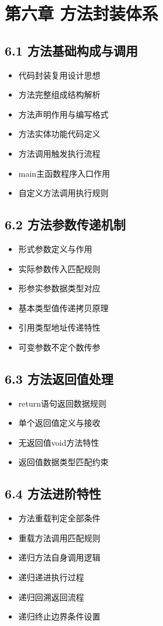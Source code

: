 \section{第六章 方法封装体系}
\subsection{6.1 方法基础构成与调用}
\begin{itemize}
\item 代码封装复用设计思想
\item 方法完整组成结构解析
\item 方法声明作用与编写格式
\item 方法实体功能代码定义
\item 方法调用触发执行流程
\item main主函数程序入口作用
\item 自定义方法调用执行规则
\end{itemize}

\subsection{6.2 方法参数传递机制}
\begin{itemize}
\item 形式参数定义与作用
\item 实际参数传入匹配规则
\item 形参实参数据类型对应
\item 基本类型值传递拷贝原理
\item 引用类型地址传递特性
\item 可变参数不定个数传参
\end{itemize}

\subsection{6.3 方法返回值处理}
\begin{itemize}
\item return语句返回数据规则
\item 单个返回值定义与接收
\item 无返回值void方法特性
\item 返回值数据类型匹配约束
\end{itemize}

\subsection{6.4 方法进阶特性}
\begin{itemize}
\item 方法重载判定全部条件
\item 重载方法调用匹配规则
\item 递归方法自身调用逻辑
\item 递归递进执行过程
\item 递归回溯返回流程
\item 递归终止边界条件设置
\end{itemize}

